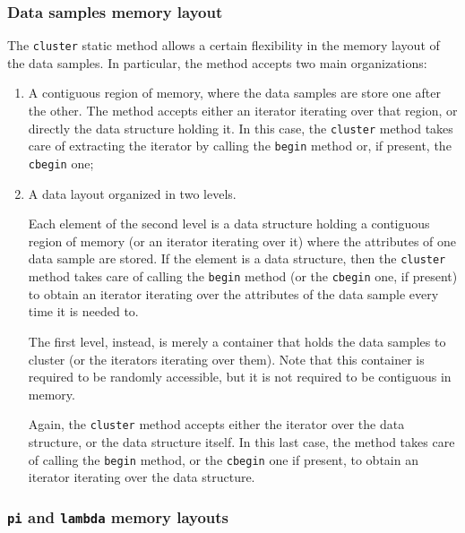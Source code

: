 \documentclass{article}
\begin{document}
\hypertarget{par-data-samples-layout}{
    \subsubsection{Data samples memory layout}
    \label{par-data-samples-layout}}

The \texttt{cluster} static method allows a certain flexibility in the memory layout of the data
samples. In particular, the method accepts two main organizations:
\begin{enumerate}
    \item A contiguous region of memory, where the data samples are store one after the other.
    The method accepts either an iterator iterating over that region, or directly the data
    structure holding it. In this case, the \texttt{cluster} method takes care of extracting the
    iterator by calling the \texttt{begin} method or, if present, the \texttt{cbegin} one;
    
    \item A data layout organized in two levels.
    
    Each element of the second level is a data structure holding a contiguous region of memory
    (or an iterator iterating over it) where the attributes of one data sample are stored.
    If the element is a data structure, then the \texttt{cluster} method takes care of calling the
    \texttt{begin} method (or the \texttt{cbegin} one, if present) to obtain an iterator
    iterating over the attributes of the data sample every time it is needed to.
    
    The first level, instead, is merely a container that holds the data samples to
    cluster (or the iterators iterating over them).
    Note that this container is required to be randomly accessible, but it is not required to be
    contiguous in memory.
    
    Again, the \texttt{cluster} method accepts either the iterator over the data structure, or
    the data structure itself. In this last case, the method takes care of calling the
    \texttt{begin} method, or the \texttt{cbegin} one if present, to obtain an iterator iterating
    over the data structure.

\end{enumerate}

\hypertarget{par-pi-lambda-layout}{
    \subsubsection{\texttt{pi} and \texttt{lambda} memory layouts}
    \label{par-pi-lambda-layout}}
\end{document}
